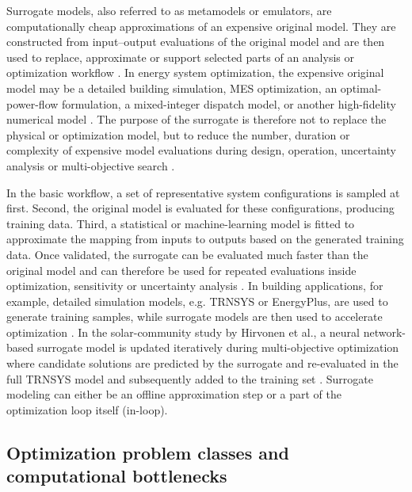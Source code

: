 \documentclass[final,5p,times,twocolumn]{elsarticle}
\begin{document}
Surrogate models, also referred to as metamodels or emulators, are
computationally cheap approximations of an expensive original model.
They are constructed from input--output evaluations of the original
model and are then used to replace, approximate or support selected
parts of an analysis or optimization workflow
\cite{Bhosekar2018,Westermann2019,FernandezGodino2023}. In energy system
optimization, the expensive original model may be a detailed building
simulation, MES optimization, an optimal-power-flow formulation, a
mixed-integer dispatch model, or another high-fidelity numerical model
\cite{Westermann2019,Hirvonen2017323,Manco2024,Klemm2021,Ruan2021221}.
The purpose of the surrogate is therefore not to replace the physical or
optimization model, but to reduce the number, duration or complexity of
expensive model evaluations during design, operation, uncertainty
analysis or multi-objective search
\cite{Bhosekar2018,DiazManriquez2016,Hirvonen2017323}.

In the basic workflow, a set of representative system configurations is
sampled at first. Second, the original model is evaluated for these
configurations, producing training data. Third, a statistical or
machine-learning model is fitted to approximate the mapping from inputs
to outputs based on the generated training data. Once validated, the
surrogate can be evaluated much faster than the original model and can
therefore be used for repeated evaluations inside optimization,
sensitivity or uncertainty analysis
\cite{Bhosekar2018,Westermann2019,FernandezGodino2023}. In building
applications, for example, detailed simulation models, e.g. TRNSYS or
EnergyPlus, are used to generate training samples, while surrogate
models are then used to accelerate optimization
\cite{Hirvonen2017323,Westermann2019,Elwy2024,Zhang2026_building}. In
the solar-community study by Hirvonen et al., a neural network-based
surrogate model is updated iteratively during multi-objective
optimization where candidate solutions are predicted by the surrogate
and re-evaluated in the full TRNSYS model and subsequently added to the
training set \cite{Hirvonen2017323}. Surrogate modeling can either be an
offline approximation step or a part of the optimization loop itself
(in-loop).

\subsection{Optimization problem classes and computational bottlenecks}
\label{sec:optimization-bottlenecks}
\end{document}
